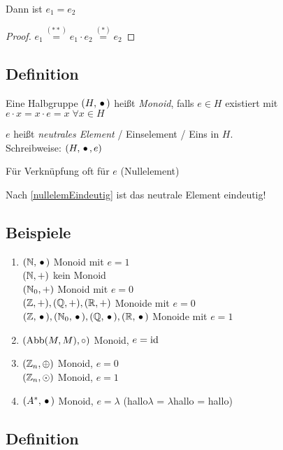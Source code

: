  Dann ist $e_1 = e_2$
 
 \begin{proof}
 $e_1 \stackrel{(**)}{=} e_1 \cdot e_2 \stackrel{(*)}{=} e_2$
 \end{proof} 
 
 
 \subsection[Definition: Monoid]{Definition}
 
 Eine Halbgruppe $(H, \,{\bullet}\,)$ heißt \emph{Monoid}, falls $e \in H$ existiert mit $e\cdot x = x \cdot e = x \; \forall x \in H$
 
 $e$ heißt \emph{neutrales Element} / Einselement / Eins in $H$.
 \\Schreibweise: $(H, \,{\bullet}\,, e)$
 
 Für  Verknüpfung oft  für $e$ (Nullelement)
 
 Nach \ref{nullelemEindeutig} ist das neutrale Element eindeutig!
 
 \subsection{Beispiele}
 
 \begin{enumerate}

	\item
	$(\mathbb{N}, \,{\bullet}\,)$ Monoid mit $e=1$
	\\$(\mathbb{N}, +)$ kein Monoid
	\\$(\mathbb{N}_0, +)$ Monoid mit $e=0$
	\\$(\mathbb{Z}, +), (\mathbb{Q}, +), (\mathbb{R}, +)$ Monoide mit $e=0$
	\\$(\mathbb{Z}, \,{\bullet}\,), (\mathbb{N}_0, \,{\bullet}\,), (\mathbb{Q}, \,{\bullet}\,), (\mathbb{R}, \,{\bullet}\,)$ Monoide mit $e=1$
	
	\item
	$(\mathrm{Abb}(M, M), \circ)$ Monoid, $e = \mathrm{id}$
	
	\item
	$(\mathbb{Z}_n, \oplus)$ Monoid, $e=0$
	\\ $(\mathbb{Z}_n, \odot)$ Monoid, $e=1$
	
	\item
	$(A^*, \,{\bullet}\,)$ Monoid, $e= \lambda$ (hallo$\lambda$ = $\lambda$hallo = hallo)

 \end{enumerate}
 
 \subsection[Definition: Untermonoid]{Definition}
 
